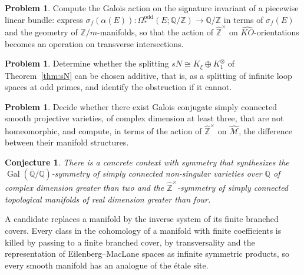 \documentclass[11pt]{amsart}
\theoremstyle{plain}
\newtheorem*{conjecture*}{Conjecture}
\theoremstyle{definition}
\newtheorem{problem}[theorem]{Problem}
\numberwithin{equation}{section}
\newcommand{\Z}{\mathbb{Z}}
\newcommand{\Q}{\mathbb{Q}}
\newcommand{\Zhat}{\widehat{\mathbb{Z}}}
\newcommand{\Qbar}{\overline{\mathbb{Q}}}
\newcommand{\KO}{\mathit{KO}}
\newcommand{\units}{^{\times}}
\DeclareMathOperator{\Gal}{Gal}
\begin{document}
\begin{problem}
Compute the Galois action on the signature invariant of a piecewise linear bundle: express $\sigma_f(\alpha(E))\colon\Omega^{\mathrm{odd}}_*(E;\Q/\Z)\to\Q/\Z$ in terms of $\sigma_f(E)$ and the geometry of $\Z/m$-manifolds, so that the action of $\Zhat\units$ on $\widehat{\KO}$-orientations becomes an operation on transverse intersections.
\end{problem}

\begin{problem}
Determine whether the splitting $sN\cong K_\xi\oplus K^\otimes_1$ of Theorem~\ref{thm:sN} can be chosen additive, that is, as a splitting of infinite loop spaces at odd primes, and identify the obstruction if it cannot.
\end{problem}

\begin{problem}
Decide whether there exist Galois conjugate simply connected smooth projective varieties, of complex dimension at least three, that are not homeomorphic, and compute, in terms of the action of $\Zhat\units$ on $\widehat{\mathcal M}$, the difference between their manifold structures.
\end{problem}

\begin{conjecture*}
There is a concrete context with symmetry that synthesizes the $\Gal(\Qbar/\Q)$-symmetry of simply connected non-singular varieties over $\Q$ of complex dimension greater than two and the $\Zhat\units$-symmetry of simply connected topological manifolds of real dimension greater than four.
\end{conjecture*}

A candidate replaces a manifold by the inverse system of its finite branched covers.
Every class in the cohomology of a manifold with finite coefficients is killed by passing to a finite branched cover, by transversality and the representation of Eilenberg--MacLane spaces as infinite symmetric products, so every smooth manifold has an analogue of the \'etale site.
\end{document}
